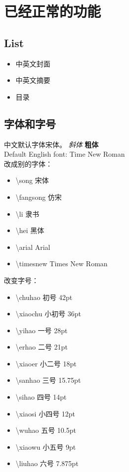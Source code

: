 \section{已经正常的功能}
\subsection{List}
	\begin{itemize}
		\item 中英文封面
		\item 中英文摘要
		\item 目录
	\end{itemize}
\subsection{字体和字号}

	中文默认字体宋体。 \textit{斜体} \textbf{粗体} \\
	Default English font: Time New Roman\\

	 改成别的字体：
	 \begin{itemize}
	 \item {\song \textbackslash song 宋体}
	 \item {\fangsong \textbackslash fangsong 仿宋}
	 \item {\li \textbackslash li 隶书}
	 \item {\hei \textbackslash hei 黑体}
	 \item {\arial \textbackslash arial Arial}
	 \item {\timesnew \textbackslash timesnew Times New Roman}
	 \end{itemize}

	 \vspace*{1em}改变字号：
	 \begin{itemize}
		 \item {\chuhao \textbackslash chuhao 初号 42pt}
		 \item {\xiaochu \textbackslash xiaochu 小初号 36pt}
		 \item {\yihao \textbackslash yihao 一号 28pt}
		 \item {\erhao  \textbackslash erhao 二号 21pt}
		 \item {\xiaoer \textbackslash xiaoer 小二号 18pt}
		 \item {\sanhao \textbackslash sanhao 三号 15.75pt}
		 \item {\sihao \textbackslash sihao 四号 14pt}
		 \item {\xiaosi \textbackslash xiaosi 小四号 12pt}
		 \item {\wuhao \textbackslash wuhao 五号 10.5pt}
		 \item {\xiaowu \textbackslash xiaowu 小五号 9pt}
		 \item {\liuhao \textbackslash liuhao 六号 7.875pt}
		 
	 \end{itemize}
	 
